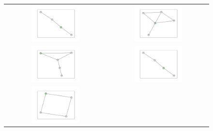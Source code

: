 \documentclass[12pt, a4paper]{extarticle}
\begin{document}
\begin{figure}\centering\begin{tabularx}{\textwidth}{cc}
\includegraphics[width=0.5\textwidth]{task11-graphlets/4_21-18-20-23.pdf} &
\includegraphics[width=0.5\textwidth]{task11-graphlets/5_21-18-25-23-24.pdf} \\
\includegraphics[width=0.5\textwidth]{task11-graphlets/5_10-16-25-23-24.pdf} &
\includegraphics[width=0.5\textwidth]{task11-graphlets/4_14-21-23-24.pdf} \\
\includegraphics[width=0.5\textwidth]{task11-graphlets/4_21-18-22-23.pdf} &

\end{tabularx}
\end{figure}
\end{document}
